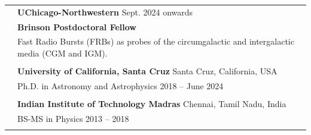 \documentclass[letterpaper, 11pt]{article}
\begin{document}
\begin{longtable}{p{1.3in}p{4.8in}}

\nohyphens{\color{OliveGreen}{Research position}}
& \textbf{UChicago-Northwestern} \hfill Sept. 2024 onwards\\
& \textbf{Brinson Postdoctoral Fellow}\\
\nohyphens{\color{OliveGreen}{Research interests}}
& Fast Radio Bursts (FRBs) as probes of the circumgalactic and intergalactic media (CGM and IGM).\\
\hline
&\\


\color{OliveGreen}{Education} 
& \textbf{University of California, Santa Cruz} \hfill Santa Cruz, California, USA \\ 
& Ph.D. in Astronomy and Astrophysics \hfill 2018 -- June 2024 \\
& \\

& \textbf{Indian Institute of Technology Madras} \hfill Chennai, Tamil Nadu, India \\
& BS-MS in Physics \hfill 2013 -- 2018\\
\hline
& \\




\end{longtable}
\end{document}
